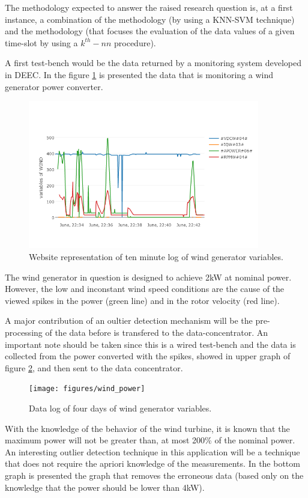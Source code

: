 The methodology expected to answer the raised research question is, at a first instance, a combination of the \cite{class:xu:2012} methodology (by using a KNN-SVM technique) and the \cite{nn:abid:2016} methodology (that focuses the evaluation of the data values of a given time-slot by using a $k^{th}-nn$ procedure).

A first test-bench would be the data returned by a monitoring system developed in DEEC. In the figure \ref{fig:website} is presented the data that is monitoring a wind generator power converter.
\begin{figure}[h!]
	\centering
	\includegraphics[width=0.90\textwidth,keepaspectratio]{figures/website}
	\caption{Website representation of ten minute log of wind generator variables. }
	\label{fig:website}
\end{figure}

The wind generator in question is designed to achieve 2kW at nominal power. However, the low and inconstant wind speed conditions are the cause of the viewed spikes in the power (green line) and in the rotor velocity (red line).

A major contribution of an oultier detection mechanism will be the pre-processing of the data before is transfered to the data-concentrator. An important note should be taken since this is a wired test-bench and the data is collected from the power converted with the spikes, showed in upper graph of figure \ref{fig:wind_power}, and then sent to the data concentrator.

\begin{figure}[h!]
	\centering
	\texttt{[image: figures/wind\_power]}
	\caption{Data log of four days of wind generator variables. }
	\label{fig:wind_power}
\end{figure}

With the knowledge of the behavior of the wind turbine, it is known that the maximum power will not be greater than, at most 200\% of the nominal power. An interesting outlier detection technique in this application will be a technique that does not require the apriori knowledge of the measurements. In the bottom graph is presented the graph that removes the erroneous data (based only on the knowledge that the power should be lower than 4kW).


